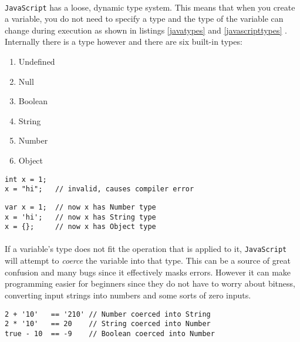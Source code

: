 
\paragraph{}
\texttt{JavaScript} has a loose, dynamic type system. This means that when you create a variable, you do not need to specify a type and the type of the variable can change during execution as shown in listings \ref{javatypes} and \ref{javascripttypes} . Internally there is a type however and there are six built-in types\cite{2ality}:
	\begin{enumerate}
	\item Undefined
	\item Null
	\item Boolean
	\item String
	\item Number
	\item Object
	\end{enumerate}
        \begin{lstlisting}[caption=Changing the type of a variable in \texttt{Java},label={javatypes}]
int x = 1;
x = "hi";   // invalid, causes compiler error
\end{lstlisting}

\begin{lstlisting}[caption=Changing the type of a variable in \texttt{JavaScript},label={javascripttypes}]
var x = 1;  // now x has Number type
x = 'hi';   // now x has String type
x = {};     // now x has Object type
\end{lstlisting}
\paragraph{}
	If a variable's type does not fit the operation that is applied to it, \texttt{JavaScript} will attempt to \emph{coerce} the variable into that type. This can be a source of great confusion and many bugs since it effectively masks errors. However it can make programming easier for beginners since they do not have to worry about bitness, converting input strings into numbers and some sorts of zero inputs.
\begin{lstlisting}[caption=Automatic type coercion]
2 + '10'   == '210' // Number coerced into String
2 * '10'   == 20    // String coerced into Number
true - 10  == -9    // Boolean coerced into Number
\end{lstlisting}

